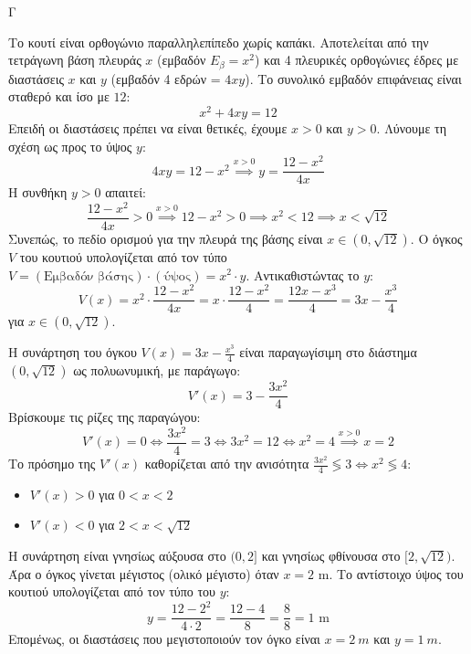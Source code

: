 \begin{thema}{Γ}
\begin{erwthma}
\item Το κουτί είναι ορθογώνιο παραλληλεπίπεδο χωρίς καπάκι. Αποτελείται από την τετράγωνη βάση πλευράς $x$ (εμβαδόν $E_{\beta} = x^2$) και 4 πλευρικές ορθογώνιες έδρες με διαστάσεις $x$ και $y$ (εμβαδόν 4 εδρών = $4xy$).
Το συνολικό εμβαδόν επιφάνειας είναι σταθερό και ίσο με $12$:
\[ x^2 + 4xy = 12 \]
Επειδή οι διαστάσεις πρέπει να είναι θετικές, έχουμε $x > 0$ και $y > 0$. Λύνουμε τη σχέση ως προς το ύψος $y$:
\[ 4xy = 12 - x^2 \overset{x>0}{\implies} y = \frac{12 - x^2}{4x} \]
Η συνθήκη $y > 0$ απαιτεί:
\[ \frac{12 - x^2}{4x} > 0 \overset{x>0}{\implies} 12 - x^2 > 0 \implies x^2 < 12 \implies x < \sqrt{12} \]
Συνεπώς, το πεδίο ορισμού για την πλευρά της βάσης είναι $x \in (0, \sqrt{12})$.
Ο όγκος $V$ του κουτιού υπολογίζεται από τον τύπο $V = (\text{Εμβαδόν βάσης}) \cdot (\text{ύψος}) = x^2 \cdot y$. Αντικαθιστώντας το $y$:
\[ V(x) = x^2 \cdot \frac{12 - x^2}{4x} = x \cdot \frac{12 - x^2}{4} = \frac{12x - x^3}{4} = 3x - \frac{x^3}{4} \]
για $x \in (0, \sqrt{12})$.

\item Η συνάρτηση του όγκου $V(x) = 3x - \frac{x^3}{4}$ είναι παραγωγίσιμη στο διάστημα $(0, \sqrt{12})$ ως πολυωνυμική, με παράγωγο:
\[ V'(x) = 3 - \frac{3x^2}{4} \]
Βρίσκουμε τις ρίζες της παραγώγου:
\[ V'(x) = 0 \Leftrightarrow \frac{3x^2}{4} = 3 \Leftrightarrow 3x^2 = 12 \Leftrightarrow x^2 = 4 \overset{x>0}{\implies} x = 2 \]
Το πρόσημο της $V'(x)$ καθορίζεται από την ανισότητα $\frac{3x^2}{4} \lessgtr 3 \Leftrightarrow x^2 \lessgtr 4$:
\begin{itemize}
    \item $V'(x) > 0$ για $0 < x < 2$
    \item $V'(x) < 0$ για $2 < x < \sqrt{12}$
\end{itemize}
\begin{center}
\end{center}
Η συνάρτηση είναι γνησίως αύξουσα στο $(0, 2]$ και γνησίως φθίνουσα στο $[2, \sqrt{12})$. Άρα ο όγκος γίνεται μέγιστος (ολικό μέγιστο) όταν ${x = 2 \text{ m}}$. 
Το αντίστοιχο ύψος του κουτιού υπολογίζεται από τον τύπο του $y$:
\[ y = \frac{12 - 2^2}{4 \cdot 2} = \frac{12 - 4}{8} = \frac{8}{8} = {1 \text{ m}} \]
Επομένως, οι διαστάσεις που μεγιστοποιούν τον όγκο είναι $x = 2\ \si{m}$ και $y = 1\ \si{m}$.


\end{erwthma}
\end{thema}
